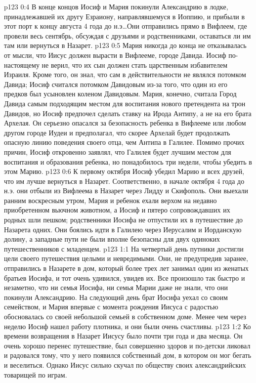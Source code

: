 \vs p123 0:4 \pc В конце концов Иосиф и Мария покинули Александрию в лодке, принадлежавшей их другу Езраиону, направлявшемуся в Иоппию, и прибыли в этот порт к концу августа 4 года до н.э\ldots Они отправились прямо в Вифлеем, где провели весь сентябрь, обсуждая с друзьями и родственниками, оставаться ли им там или вернуться в Назарет.
\vs p123 0:5 Мария никогда до конца не отказывалась от мысли, что Иисус должен вырасти в Вифлееме, городе Давида. Иосиф по\hyp{}настоящему не верил, что их сын должен стать царственным избавителем Израиля. Кроме того, он знал, что сам в действительности не являлся потомком Давида; Иосиф считался потомком Давидовым из\hyp{}за того, что один из его предков был усыновлен коленом Давидовым. Мария, конечно, считала Город Давида самым подходящим местом для воспитания нового претендента на трон Давидов, но Иосиф предпочел сделать ставку на Ирода Антипу, а не на его брата Архелая. Он серьезно опасался за безопасность ребенка в Вифлееме или любом другом городе Иудеи и предполагал, что скорее Архелай будет продолжать опасную линию поведения своего отца, чем Антипа в Галилее. Помимо прочих причин, Иосиф откровенно заявлял, что Галилея будет лучшим местом для воспитания и образования ребенка, но понадобилось три недели, чтобы убедить в этом Марию.
\vs p123 0:6 К первому октября Иосиф убедил Марию и всех друзей, что им лучше вернуться в Назарет. Соответственно, в начале октября 4 года до н.э. они отбыли из Вифлеема в Назарет через Лидду и Скифополь. Они выехали ранним воскресным утром, Мария и ребенок ехали верхом на недавно приобретенном вьючном животном, а Иосиф и пятеро сопровождавших их родных шли пешком; родственники Иосифа не отпустили их в путешествие до Назарета одних. Они боялись идти в Галилею через Иерусалим и Иорданскую долину, а западные пути не были вполне безопасны для двух одиноких путешественников с младенцем.
\vs p123 1:1 На четвертый день путники достигли цели своего путешествия целыми и невредимыми. Они, не предупредив заранее, отправились в Назарете в дом, который более трех лет занимал один из женатых братьев Иосифа, и тот очень удивился, увидев их. Все произошло так быстро и незаметно, что ни семья Иосифа, ни семья Марии даже не знали, что они покинули Александрию. На следующий день брат Иосифа уехал со своим семейством, и Мария впервые с момента рождения Иисуса с радостью обосновалась со своей небольшой семьей в собственном доме. Менее чем через неделю Иосиф нашел работу плотника, и они были очень счастливы.
\vs p123 1:2 Ко времени возвращения в Назарет Иисусу было почти три года и два месяца. Он очень хорошо перенес путешествие, был совершенно здоров и по\hyp{}детски ликовал и радовался тому, что у него появился собственный дом, в котором он мог бегать и веселиться. Однако Иисус сильно скучал по обществу своих александрийских товарищей по играм.
